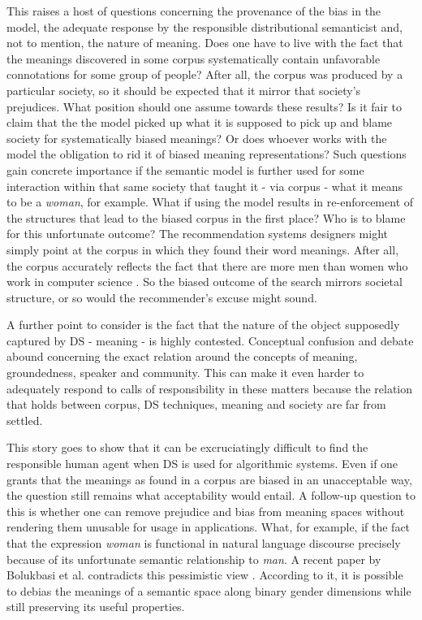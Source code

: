 \documentclass{article}
\begin{document}
This raises a host of questions concerning the provenance of the bias in the model, the adequate response by the responsible distributional semanticist and, not to mention, the nature of meaning.
Does one have to live with the fact that the meanings discovered in some corpus systematically contain unfavorable connotations for some group of people? After all, the corpus was produced by a particular society, so it should be expected that it mirror that society's prejudices. What position should one assume towards these results? Is it fair to claim that the the model picked up what it is supposed to pick up and blame society for systematically biased meanings? Or does whoever works with the model the obligation to rid it of biased meaning representations? Such questions gain concrete importance if the semantic model is further used for some interaction within that same society that taught it - via corpus - what it means to be a \emph{woman}, for example. 
What if using the model results in re-enforcement of the structures that lead to the biased corpus in the first place? 
Who is to blame for this unfortunate outcome? The recommendation systems designers might simply point at the corpus in which they found their word meanings. After all, the corpus accurately reflects the fact that there are more men than women who work in computer science \cite{womenincs}. So the biased outcome of the search mirrors societal structure, or so would the recommender's excuse might sound. 

A further point to consider is the fact that the nature of the object supposedly captured by DS - meaning - is highly contested. Conceptual confusion and debate abound concerning the exact relation around the concepts of meaning, groundedness, speaker and community. This can make it even harder to adequately respond to calls of responsibility in these matters because the relation that holds between corpus, DS techniques, meaning and society are far from settled. 

This story goes to show that it can be excruciatingly difficult to find the responsible human agent when DS is used for algorithmic systems. Even if one grants that the meanings as found in a corpus are biased in an unacceptable way, the question still remains what acceptability would entail. A follow-up question to this is whether one can remove prejudice and bias from meaning spaces without rendering them unusable for usage in applications. What, for example, if the fact that the expression \emph{woman} is functional in natural language discourse precisely because of its unfortunate semantic relationship to \emph{man}. A recent paper by Bolukbasi et al. contradicts this pessimistic view \cite{bolukbasi2016man}. According to it, it is possible to debias the meanings of a semantic space along binary gender dimensions while still preserving its useful properties.
\end{document}
